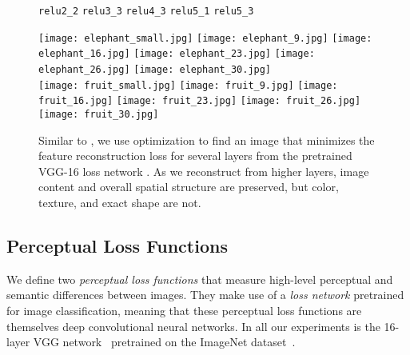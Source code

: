 \documentclass[runningheads]{llncs}
\begin{document}
\begin{figure}[t]
  \hspace{10.5mm} 
  \hspace{10mm} \verb|relu2_2|
  \hspace{5.5mm} \verb|relu3_3|
  \hspace{5.5mm} \verb|relu4_3|
  \hspace{5.5mm} \verb|relu5_1|
  \hspace{5.5mm} \verb|relu5_3|
  \vspace{-2mm}
  \begin{center}
    \texttt{[image: elephant\_small.jpg]}
    \texttt{[image: elephant\_9.jpg]}
    \texttt{[image: elephant\_16.jpg]}
    \texttt{[image: elephant\_23.jpg]}
    \texttt{[image: elephant\_26.jpg]}
    \texttt{[image: elephant\_30.jpg]} \\
    \texttt{[image: fruit\_small.jpg]}
    \texttt{[image: fruit\_9.jpg]}
    \texttt{[image: fruit\_16.jpg]}
    \texttt{[image: fruit\_23.jpg]}
    \texttt{[image: fruit\_26.jpg]}
    \texttt{[image: fruit\_30.jpg]}
  \end{center}
  \vspace{-5mm}
  \caption{Similar to \cite{mahendran15understanding}, we use optimization to find an image
     that minimizes the feature reconstruction loss
     for several layers  from the pretrained VGG-16
    loss network . As we reconstruct from higher layers, image content and overall
    spatial structure are preserved, but color, texture, and exact shape are not.
  }
  \label{fig:feature-loss}
\end{figure}


\subsection{Perceptual Loss Functions}
We define two \emph{perceptual loss functions} that measure high-level perceptual and semantic
differences between images. They make use of a \emph{loss network}  pretrained
for image classification, meaning that these perceptual loss functions
are themselves deep convolutional neural networks. In all our experiments  is the 
16-layer VGG network~\cite{simonyan2014very} pretrained on the ImageNet dataset~\cite{ILSVRC15}.
\end{document}
